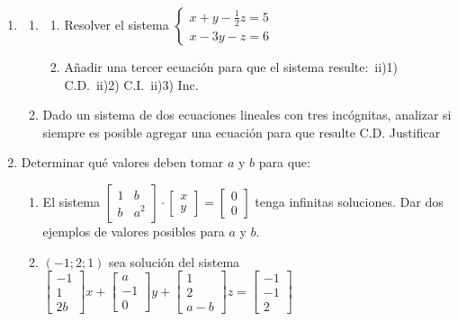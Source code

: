 \documentclass[11pt]{article}
\begin{document}
\begin{enumerate}[\hspace{-7mm} 1) ]
\item \begin{enumerate}
		\item \begin{enumerate}
			\item[i)] Resolver el sistema \(
			\left \{
			\begin{array}{l}
				x+y-\tfrac{1}{2}z=5 \\
				x-3y-z=6
			\end{array}
			\right .
			\) 
			\item[ii)] Añadir una tercer ecuación para que el sistema resulte:\ ii)1) C.D.\   ii)2) C.I.\  ii)3) Inc.
		\end{enumerate} 
	
	\item Dado un sistema de dos ecuaciones lineales con tres incógnitas, analizar si siempre es posible agregar una ecuación para que resulte C.D. Justificar
\end{enumerate}


\item Determinar qué valores deben tomar $a$ y $b$ para que:

\begin{enumerate}
	\item El sistema \(\left[\begin{matrix}
		1 & b\\ 
		b&a^2
	\end{matrix}\right]
	\cdot
	\left[\begin{matrix}
		x\\
		y
	\end{matrix}\right]
	=
	\left[\begin{matrix}
		0\\0
			\end{matrix}
	\right]\) tenga infinitas soluciones. Dar dos ejemplos de valores posibles para $a$ y $b$.
	
	\item \((-1;2;1)\) sea solución del sistema \(\left[\begin{matrix}
		-1\\1\\2b
	\end{matrix}\right]
	x + 
	\left[\begin{matrix}
		a\\-1\\0
	\end{matrix}\right]
	y + 
	\left[\begin{matrix}
		1\\2\\a-b
	\end{matrix}\right]
	z =
	\left[\begin{matrix}
		-1\\-1\\2
	\end{matrix}
	\right]\)
	

\end{enumerate}
\end{enumerate}
\end{document}
